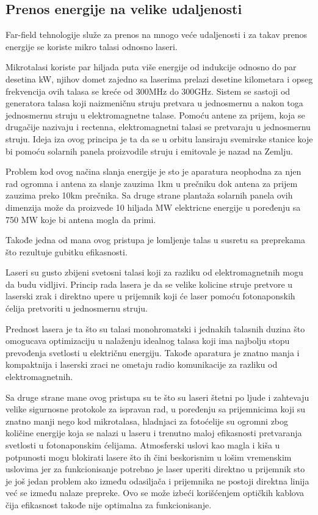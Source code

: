 \documentclass[a4paper]{article}
\begin{document}
\subsection{Prenos energije na velike udaljenosti}
\label{subsec:prenosenergijenavelikeudaljenosti}


Far-field tehnologije služe za prenos na mnogo veće udaljenosti i za takav prenos energije se koriste mikro talasi odnosno laseri.

Mikrotalasi koriste par hiljada puta više energije od indukcije odnosno do par desetina kW, njihov domet zajedno sa laserima prelazi desetine kilometara i opseg frekvencija ovih talasa se kreće od 300MHz do 300GHz. Sistem se sastoji od generatora talasa koji naizmeničnu struju pretvara u jednosmernu a nakon toga jednosmernu struju u elektromagnetne talase. Pomoću antene za prijem, koja se drugačije nazivaju i rectenna, elektromagnetni talasi se pretvaraju u jednosmernu struju. Ideja iza ovog principa je ta da se u orbitu lansiraju svemirske stanice koje bi pomoću solarnih panela proizvodile struju i emitovale je nazad na Zemlju.

Problem kod ovog načina slanja energije je sto je aparatura neophodna za njen rad ogromna i antena za slanje zauzima 1km u prečniku dok antena za prijem zauzima preko 10km prečnika. Sa druge strane plantaža solarnih panela ovih dimenzija može da proizvede 10 hiljada MW elektricne energije u poređenju sa 750 MW koje bi antena mogla da primi.

Takođe jedna od mana ovog pristupa je lomljenje talas u susretu sa preprekama što rezultuje gubitku efikasnosti.

Laseri su gusto zbijeni svetosni talasi koji za razliku od elektromagnetnih mogu da budu vidljivi. Princip rada lasera je da se velike kolicine struje pretvore u laserski zrak i direktno upere u prijemnik koji će laser pomoću fotonaponskih ćelija pretvoriti u jednosmernu struju.

Prednost lasera je ta što su talasi monohromatski i jednakih talasnih duzina što omogucava optimizaciju u nalaženju idealnog talasa koji ima najbolju stopu prevođenja svetlosti u električnu energiju. Takođe aparatura je znatno manja i kompaktnija i laserski zraci ne ometaju radio komunikacije za razliku od elektromagnetnih.

Sa druge strane mane ovog pristupa su te što su laseri štetni po ljude i zahtevaju velike sigurnosne protokole za ispravan rad, u poređenju sa prijemnicima koji su znatno manji nego kod mikrotalasa, hladnjaci za fotoćelije su ogromni zbog količine energije koja se nalazi u laseru i trenutno maloj efikasnosti pretvaranja svetlosti u fotonaponskim ćelijama. Atmosferski uslovi kao magla i kiša u potpunosti mogu blokirati lasere što ih čini beskorisnim u lošim vremenskim uslovima jer za funkcionisanje potrebno je laser uperiti direktno u prijemnik sto je još jedan problem ako između odasiljača i prijemnika ne postoji direktna linija već se između nalaze prepreke. Ovo se može izbeći korišćenjem optičkih kablova čija efikasnost takođe nije optimalna za funkcionisanje.



\end{document}

